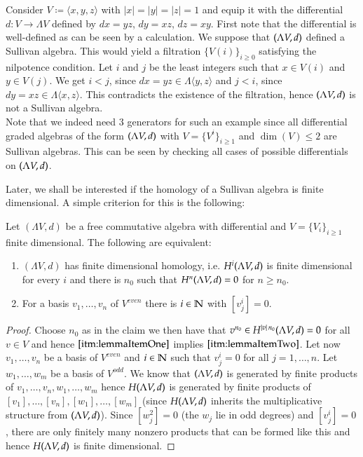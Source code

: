\begin{Example}
 Consider  $V \coloneqq \langle x,y,z \rangle$ with $|x| = |y| = |z| = 1$ and 
 equip it with the differential $d \colon V \to \Lambda V$  defined by $dx = yz$, $dy = xz$, $dz = xy$. \newline
 First note that the differential is well-defined as can be seen by a calculation.
 We suppose that $(\Lambda V,d)$ defined a Sullivan algebra. This would yield a filtration ${\lbrace V(i) \rbrace}_{i \geq 0}$ satisfying
 the nilpotence condition. Let $i$ and $j$ be the least integers such that $x \in V(i)$ and $y \in V(j)$. We get
 $i < j$, since $dx = yz \in \Lambda \langle y,z \rangle$ and $j < i$, since $dy = xz \in \Lambda \langle x,z \rangle$.
 This contradicts the existence of the filtration, hence $(\Lambda V,d)$ is not a Sullivan algebra. \\
 Note that we indeed need $3$ generators for such an example since all differential graded algebras of the form
	$(\Lambda V,d)$ with $ V = {\lbrace V^i \rbrace}_{i \geq 1}$ and $\dim (V) \leq 2$ are Sullivan algebras. This can be 
 seen by checking all cases of possible differentials on $(\Lambda V,d)$.
 \end{Example}
 
 Later, we shall be interested if the homology of a Sullivan algebra is finite dimensional. A simple criterion 
 for this is the following:
 \begin{Lemma}
  Let $(\Lambda V,d)$ be a free commutative algebra with differential and $V = {\lbrace V_i \rbrace}_{i \geq 1}$ finite dimensional.
  The following are equivalent:
  
  \begin{enumerate}
   \item \label{itm:lemmaItemOne} $(\Lambda V,d)$ has finite dimensional homology, i.e. $H^i (\Lambda V,d)$ is finite dimensional for every
   $i$ and there is $n_0$ such that  $H^n (\Lambda V,d) = 0$ for $n \geq n_0$.
   \item \label{itm:lemmaItemTwo} For a basis $ v_1, \ldots, v_n$ of $V^{even}$ there is 
  $i \in \mathbb{N}$ with $[v^i_j] = 0$.
  \end{enumerate}

 \end{Lemma}
 
 \begin{proof}
  Choose $n_0$ as in the claim we then have that $v^{n_0} \in H^{|v| \, n_0} (\Lambda V,d) = 0$ for all $v \in V$ and hence 
  $\ref{itm:lemmaItemOne}$ implies $\ref{itm:lemmaItemTwo}$.
  Let now $v_1, \ldots, v_n$ be a basis of $V^{even}$ and $i \in \mathbb{N}$ such that $v_j^i = 0$ for all $j = 1, \ldots, n$. Let
  $w_1, \ldots, w_m$ be a basis of $V^{odd}$. We know that $(\Lambda V,d)$ is generated by finite products
  of $v_1, \ldots, v_n, w_1, \ldots, w_m$  hence  $H (\Lambda V,d) $ is generated by finite 
  products of $[v_1], \ldots, [v_n], [w_1], \ldots, [w_m]$ (since $H (\Lambda V,d) $ inherits the multiplicative structure from
  $(\Lambda V,d)$). Since $[w_j^2] = 0$ (the $w_j$ lie in odd degrees) and $[v_j^i] = 0$, there are only finitely
  many nonzero products that can be formed like this and hence $H (\Lambda V,d)$ is finite dimensional.
 \end{proof}

